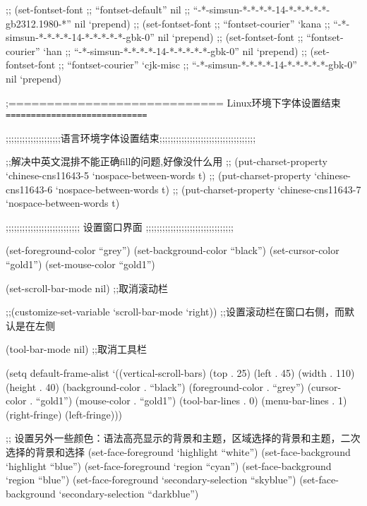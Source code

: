 \documentclass[11pt]{article}
\begin{document}
\begin{itemize}
;; (set-fontset-font 
;; ``fontset-default'' nil 
;; ``-*-simsun-*-*-*-*-14-*-*-*-*-*-gb2312.1980-*'' nil `prepend) 
;; (set-fontset-font 
;; ``fontset-courier'' `kana 
;; ``-*-simsun-*-*-*-*-14-*-*-*-*-*-gbk-0'' nil `prepend) 
;; (set-fontset-font 
;; ``fontset-courier'' `han 
;; ``-*-simsun-*-*-*-*-14-*-*-*-*-*-gbk-0'' nil `prepend) 
;; (set-fontset-font 
;; ``fontset-courier'' `cjk-misc 
;; ``-*-simsun-*-*-*-*-14-*-*-*-*-*-gbk-0'' nil `prepend)

;============================ Linux环境下字体设置结束 \texttt{============================}


;;;;;;;;;;;;;;;;;;;;语言环境字体设置结束;;;;;;;;;;;;;;;;;;;;;;;;;;;;;;;;;;;


;;解决中英文混排不能正确fill的问题,好像没什么用
;; (put-charset-property `chinese-cns11643-5 `nospace-between-words t)
;; (put-charset-property `chinese-cns11643-6 `nospace-between-words t)
;; (put-charset-property `chinese-cns11643-7 `nospace-between-words t)


;;;;;;;;;;;;;;;;;;;;;;;;;;;  设置窗口界面 ;;;;;;;;;;;;;;;;;;;;;;;;;;;;;;;;

(set-foreground-color ``grey'')
(set-background-color ``black'')
(set-cursor-color ``gold1'')
(set-mouse-color ``gold1'')

(set-scroll-bar-mode nil)
;;取消滚动栏

;;(customize-set-variable `scroll-bar-mode `right))
;;设置滚动栏在窗口右侧，而默认是在左侧

(tool-bar-mode nil)
;;取消工具栏

(setq default-frame-alist
             `((vertical-scroll-bars)  
               (top . 25)
               (left . 45)                               
               (width . 110)
               (height . 40)           
               (background-color . ``black'')
               (foreground-color . ``grey'')
               (cursor-color     . ``gold1'')
               (mouse-color      . ``gold1'')
               (tool-bar-lines . 0)
               (menu-bar-lines . 1)
               (right-fringe)
               (left-fringe)))

               
;; 设置另外一些颜色：语法高亮显示的背景和主题，区域选择的背景和主题，二次选择的背景和选择
(set-face-foreground `highlight ``white'')
(set-face-background `highlight ``blue'')
(set-face-foreground `region ``cyan'')
(set-face-background `region ``blue'')
(set-face-foreground `secondary-selection ``skyblue'')
(set-face-background `secondary-selection ``darkblue'')


\end{itemize}
\end{document}
